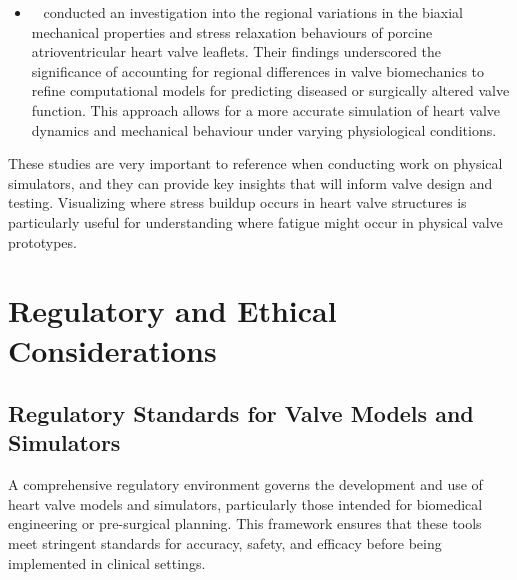 \begin{itemize}
    \item ~ conducted an investigation into the regional variations in the biaxial mechanical properties and stress relaxation behaviours of porcine atrioventricular heart valve leaflets. Their findings underscored the significance of accounting for regional differences in valve biomechanics to refine computational models for predicting diseased or surgically altered valve function. This approach allows for a more accurate simulation of heart valve dynamics and mechanical behaviour under varying physiological conditions.
\end{itemize}
These studies are very important to reference when conducting work on physical simulators, and they can provide key insights that will inform valve design and testing. Visualizing where stress buildup occurs in heart valve structures is particularly useful for understanding where fatigue might occur in physical valve prototypes.







\section{Regulatory and Ethical Considerations}

\subsection{Regulatory Standards for Valve Models and Simulators}
A comprehensive regulatory environment governs the development and use of heart valve models and simulators, particularly those intended for biomedical engineering or pre-surgical planning. This framework ensures that these tools meet stringent standards for accuracy, safety, and efficacy before being implemented in clinical settings.

